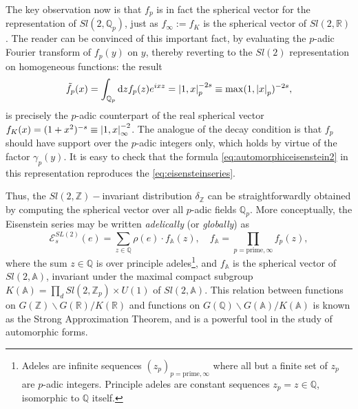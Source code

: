 The key observation now is that $f_p$ is in fact the spherical vector for the 
representation of $Sl(2,\mathbb{Q}_p)$, just as $f_\infty:= f_K$ is the
spherical
vector of $Sl(2,\mathbb{R})$. The reader can be convinced of this important
fact, by evaluating the $p$-adic Fourier transform of $f_p(y)$ on $y$, thereby
reverting to the $Sl(2)$ representation on homogeneous functions: the result
\begin{equation}
  \tilde{f}_p(x) = \int_{\mathbb{Q}_p}\dd z f_p(z)e^{ixz}
  = \abs{1,x}_p^{-2s}\equiv \mathrm{max}(1,\abs{x}_p)^{-2s},
\end{equation}
is precisely the $p$-adic counterpart of the real spherical vector $f_K(x)
= (1+x^2)^{-s}\equiv\abs{1,x}^{-2}_{\infty}$. The analogue of the decay
condition is that $f_p$ should have support over the $p$-adic integers only,
which holds by virtue of the  factor $\gamma_p(y)$. It is easy to check
that the formula \eqref{eq:automorphiceisenstein2} in this representation
reproduces the \eqref{eq:eisensteinseries}.
\par Thus, the $Sl(2,\mathbb{Z})-$invariant distribution $\delta_{\mathbb{Z}}$
can be straightforwardly obtained by computing the  spherical vector over 
all $p$-adic fields $\mathbb{Q}_p$. More conceptually, the  Eisenstein series
may be written \textit{adelically} (or \textit{globally}) as
\begin{equation}
  \mathcal{E}_s^{SL(2)}(e) = \sum_{z\in\mathbb{Q}}\rho(e)\cdot
  f_{\mathbb{A}}(z),\quad f_{\mathbb{A}}
  = \prod_{p=\mathrm{prime},\infty}f_p(z),
\end{equation}
where the sum $z\in\mathbb{Q}$ is over principle adeles\footnote{Adeles are
  infinite sequences $(z_p)_{p=\mathrm{prime},\infty}$ where all but a  finite
  set of $z_p$ are  $p$-adic integers. Principle adeles are constant sequences
  $z_p = z\in \mathbb{Q}$, isomorphic to $\mathbb{Q}$ itself.}, and
  $f_{\mathbb{A}}$ is the spherical vector of $Sl(2,\mathbb{A})$, invariant
  under the maximal compact subgroup $K(\mathbb{A}) =\prod_d
  Sl(2,\mathbb{Z}_p)\times U(1)$ of $Sl(2,\mathbb{A})$. This relation between
  functions on $G(\mathbb{Z})\backslash G(\mathbb{R})/K(\mathbb{R})$ and
  functions on $G(\mathbb{Q})\backslash G(\mathbb{A})/K(\mathbb{A})$ is known
  as the Strong Approximation Theorem, and is a powerful tool in the study of 
  automorphic forms.
